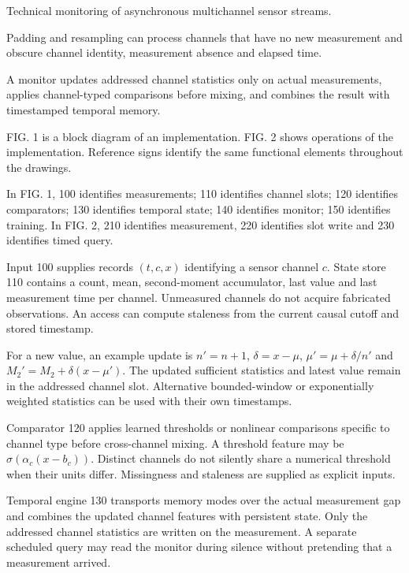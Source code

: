 \documentclass[pct]{sm-patent}
\begin{document}
\descriptionstart


\pnum Technical monitoring of asynchronous multichannel sensor streams.


\pnum Padding and resampling can process channels that have no new measurement and obscure channel identity, measurement absence and elapsed time.


\pnum A monitor updates addressed channel statistics only on actual measurements, applies channel-typed comparisons before mixing, and combines the result with timestamped temporal memory.


\pnum FIG. 1 is a block diagram of an implementation. FIG. 2 shows operations of the implementation. Reference signs identify the same functional elements throughout the drawings.


\pnum In FIG. 1, 100 identifies measurements; 110 identifies channel slots; 120 identifies comparators; 130 identifies temporal state; 140 identifies monitor; 150 identifies training. In FIG. 2, 210 identifies measurement, 220 identifies slot write and 230 identifies timed query.

\pnum Input 100 supplies records $(t,c,x)$ identifying a sensor channel $c$. State store 110 contains a count, mean, second-moment accumulator, last value and last measurement time per channel. Unmeasured channels do not acquire fabricated observations. An access can compute staleness from the current causal cutoff and stored timestamp.

\pnum For a new value, an example update is $n'=n+1$, $\delta=x-\mu$, $\mu'=\mu+\delta/n'$ and $M_2'=M_2+\delta(x-\mu')$. The updated sufficient statistics and latest value remain in the addressed channel slot. Alternative bounded-window or exponentially weighted statistics can be used with their own timestamps.

\pnum Comparator 120 applies learned thresholds or nonlinear comparisons specific to channel type before cross-channel mixing. A threshold feature may be $\sigma(\alpha_c(x-b_c))$. Distinct channels do not silently share a numerical threshold when their units differ. Missingness and staleness are supplied as explicit inputs.

\pnum Temporal engine 130 transports memory modes over the actual measurement gap and combines the updated channel features with persistent state. Only the addressed channel statistics are written on the measurement. A separate scheduled query may read the monitor during silence without pretending that a measurement arrived.
\end{document}
